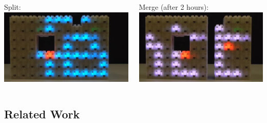 \begin{frame}
\begin{center}
\begin{columns}[c]
	\begin{column}{.5\textwidth}
		\centering
		Split:\\
		\href{run:videos/32-split.avi?autostart&loop}{\includegraphics[width=0.9\linewidth]{videos/32-split.jpg}}
	\end{column}
	\begin{column}{.5\textwidth}
		\centering
		Merge (after 2 hours):\\
		\href{run:videos/32-merge.avi?autostart&loop}{\includegraphics[width=0.9\linewidth]{videos/32-merge.jpg}}		
	\end{column} 
\end{columns}
\end{center}

\end{frame}

\subsection{Related Work}

